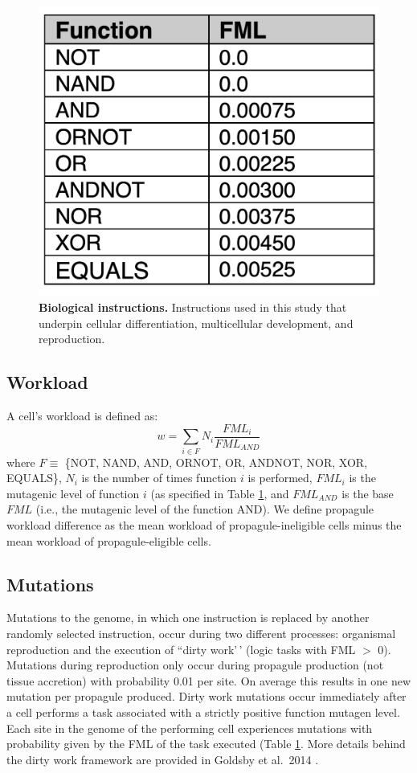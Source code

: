 \documentclass[
]{book}
\begin{document}
\begin{figure}
\centering
\includegraphics{images/SI_Table_FML.png}
\caption{\label{fig:FML}\textbf{Biological instructions.} Instructions used in this study that underpin cellular differentiation, multicellular development, and reproduction.}
\end{figure}

\hypertarget{workload}{%
\subsection{Workload}\label{workload}}

A cell's workload is defined as:
\[ w = \sum_{i \in F} N_i \frac{FML_i}{FML_{AND}} \]
where \(F \equiv\) \{NOT, NAND, AND, ORNOT, OR, ANDNOT, NOR, XOR, EQUALS\}, \(N_i\) is the number of times function \(i\) is performed, \(FML_i\) is the mutagenic level of function \(i\) (as specified in Table \ref{fig:FML}, and \(FML_{AND}\) is the base \(FML\) (i.e., the mutagenic level of the function AND).
We define propagule workload difference as the mean workload of propagule-ineligible cells minus the mean workload of propagule-eligible cells.

\hypertarget{mutations}{%
\subsection{Mutations}\label{mutations}}

Mutations to the genome, in which one instruction is replaced by another randomly selected instruction, occur during two different processes: organismal reproduction and the execution of ``dirty work'\,' (logic tasks with FML \(>\) 0).
Mutations during reproduction only occur during propagule production (not tissue accretion) with probability 0.01 per site. On average this results in one new mutation per propagule produced. Dirty work mutations occur immediately after a cell performs a task associated with a strictly positive function mutagen level. Each site in the genome of the performing cell experiences mutations with probability given by the FML of the task executed (Table \ref{fig:FML}. More details behind the dirty work framework are provided in Goldsby et al.~2014 \citep{goldsby2014evolutionary}.
\end{document}
